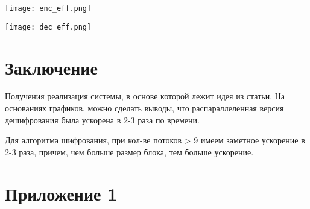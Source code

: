 \documentclass{article}
\begin{document}
\begin{minipage}{0.49\linewidth}
    \texttt{[image: enc\_eff.png]}
\end{minipage}
\hfill
\begin{minipage}{0.49\linewidth}
    \texttt{[image: dec\_eff.png]}
\end{minipage}

\newpage
\section{Заключение}
Получения реализация системы, в основе которой лежит идея из статьи. На основаниях графиков, можно сделать выводы, что
распараллеленная версия дешифрования была ускорена в 2-3 раза по времени.

Для алгоритма шифрования, при кол-ве потоков > 9 имеем заметное ускорение в 2-3 раза, причем,
чем больше размер блока, тем больше ускорение.

\newpage
\section{Приложение 1}


%
\end{document}
